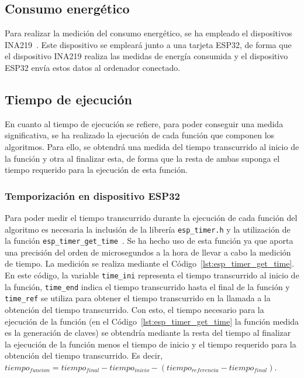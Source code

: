 \subsection{Consumo energético}\label{subsec:energia}

Para realizar la medición del consumo energético, se ha empleado el dispositivos INA219~\cite{ina219}.
Este dispositivo se empleará junto a una tarjeta ESP32, de forma que el dispositivo INA219 realiza las medidas de energía consumida y el dispositivo ESP32 envía estos datos al ordenador conectado.


\subsection{Tiempo de ejecución}\label{subsec:tiempo}

En cuanto al tiempo de ejecución se refiere, para poder conseguir una medida significativa, se ha realizado la ejecución de cada función que componen los algoritmos.
Para ello, se obtendrá una medida del tiempo transcurrido al inicio de la función y otra al finalizar esta, de forma que la resta de ambas suponga el tiempo requerido para la ejecución de esta función.


\subsubsection{Temporización en dispositivo ESP32}\label{subsubsec:esp32_temp}

Para poder medir el tiempo transcurrido durante la ejecución de cada función del algoritmo es necesaria la inclusión de la librería \texttt{esp\_timer.h} y la utilización de la función \texttt{esp\_timer\_get\_time}~\cite{esp_timer_get_time}.
Se ha hecho uso de esta función ya que aporta una precisión del orden de microsegundos a la hora de llevar a cabo la medición de tiempo.
La medición se realiza mediante el Código~\ref{lst:esp_timer_get_time}.
En este código, la variable \texttt{time\_ini} representa el tiempo transcurrido al inicio de la función, \texttt{time\_end} indica el tiempo transcurrido hasta el final de la función y \texttt{time\_ref} se utiliza para obtener el tiempo transcurrido en la llamada a la obtención del tiempo transcurrido.
Con esto, el tiempo necesario para la ejecución de la función (en el Código~\ref{lst:esp_timer_get_time} la función medida es la generación de claves) se obtendría mediante la resta del tiempo al finalizar la ejecución de la función menos el tiempo de inicio y el tiempo requerido para la obtención del tiempo transcurrido.
Es decir, $tiempo_{funcion} = tiempo_{final} - tiempo_{inicio} - (tiempo_{referencia} - tiempo_{final})$.

